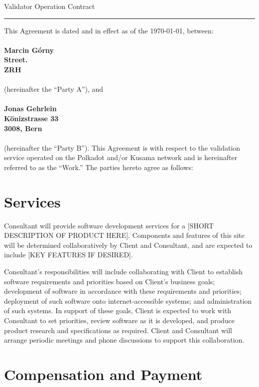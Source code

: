 \documentclass[10pt]{article}
\begin{document}
\begin{center}
{\Large Validator Operation Contract}
\end{center}

\hrule height .1mm

\vspace{.5cm}

\noindent This Agreement is dated and in effect as of the \today, between:\\
\\
{\bf Marcin Górny\\
Street.\\
ZRH\\}
\\
(hereinafter the ``Party A''), and\\
\\
{\bf Jonas Gehrlein\\
Könizstrasse 33\\
3008, Bern\\}
\\
(hereinafter the ``Party B'').  This Agreement is with respect to the
validation service operated on the Polkadot and/or Kusama network and is hereinafter referred to as the
``Work.'' The parties hereto agree as follows: 


\section{Services}

Consultant will provide software development services for a [SHORT
  DESCRIPTION OF PRODUCT HERE].  Components and features of this site will
be determined collaboratively by Client and Consultant, and are expected to
include [KEY FEATURES IF DESIRED].

Consultant's responsibilities will include collaborating with Client to
establish software requirements and priorities based on Client's business
goals; development of software in accordance with these requirements and
priorities; deployment of such software onto internet-accessible systems;
and administration of such systems.  In support of these goals, Client is
expected to work with Consultant to set priorities, review software as it is
developed, and produce product research and specifications as required.
Client and Consultant will arrange periodic meetings and phone discussions
to support this collaboration.


\section{Compensation and Payment}
\end{document}
